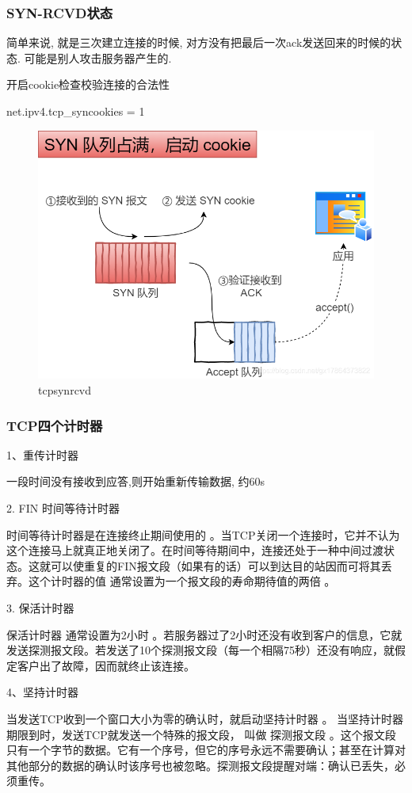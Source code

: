 \documentclass[UTF8]{ctexart}
\begin{document}
\subsubsection{SYN-RCVD状态}
简单来说, 就是三次建立连接的时候, 对方没有把最后一次ack发送回来的时候的状态. 可能是别人攻击服务器产生的. \par

开启cookie检查校验连接的合法性

net.ipv4.tcp\_syncookies = 1
\begin{figure}
	\centering
	\includegraphics[width=0.7\linewidth]{figures/tcpsynrcvd.png}
	\caption{tcpsynrcvd}
	\label{fig:tcpsynrcvd}
\end{figure}
\subsubsection{TCP四个计时器}
1、重传计时器 

一段时间没有接收到应答,则开始重新传输数据, 约60s

2. FIN 时间等待计时器

时间等待计时器是在连接终止期间使用的 。当TCP关闭一个连接时，它并不认为这个连接马上就真正地关闭了。在时间等待期间中，连接还处于一种中间过渡状态。这就可以使重复的FIN报文段（如果有的话）可以到达目的站因而可将其丢弃。这个计时器的值 通常设置为一个报文段的寿命期待值的两倍 。

3. 保活计时器 

保活计时器 通常设置为2小时 。若服务器过了2小时还没有收到客户的信息，它就发送探测报文段。若发送了10个探测报文段（每一个相隔75秒）还没有响应，就假定客户出了故障，因而就终止该连接。 

4、坚持计时器

当发送TCP收到一个窗口大小为零的确认时，就启动坚持计时器 。 当坚持计时器期限到时，发送TCP就发送一个特殊的报文段， 叫做 探测报文段 。这个报文段只有一个字节的数据。它有一个序号，但它的序号永远不需要确认；甚至在计算对其他部分的数据的确认时该序号也被忽略。探测报文段提醒对端：确认已丢失，必须重传。 
\end{document}
